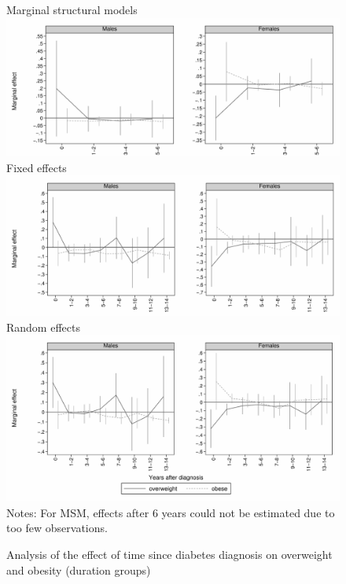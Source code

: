 \FloatBarrier
\clearpage

\begin{figure}
\begin{center}
\caption{\label{fig:duration_g_fe_mi_obese} Analysis of the effect of time since diabetes diagnosis on overweight and obesity (duration groups)}
Marginal structural models
\includegraphics[width=\linewidth]{Chapter5/Figures/mi_msm_l_all_obese.pdf}
Fixed effects
\includegraphics[width=\linewidth]{Chapter5/Figures/mi_obese_fe.pdf}
Random effects
\includegraphics[width=\linewidth]{Chapter5/Figures/mi_obese_re.pdf}
\footnotesize{Notes: For MSM, effects after 6 years could not be estimated due to too few observations.}
\end{center}
\end{figure}
\clearpage